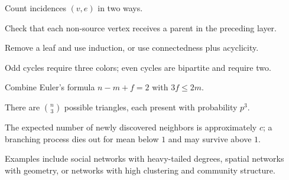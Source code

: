 \begin{selectedhints}
    \item Count incidences $(v,e)$ in two ways.
    \item Check that each non-source vertex receives a parent in the preceding layer.
    \item Remove a leaf and use induction, or use connectedness plus acyclicity.
    \item Odd cycles require three colors; even cycles are bipartite and require two.
    \item Combine Euler's formula $n-m+f=2$ with $3f\le2m$.
    \item There are $\binom n3$ possible triangles, each present with probability $p^3$.
    \item The expected number of newly discovered neighbors is approximately $c$; a branching process dies out for mean below $1$ and may survive above $1$.
    \item Examples include social networks with heavy-tailed degrees, spatial networks with geometry, or networks with high clustering and community structure.
\end{selectedhints}
